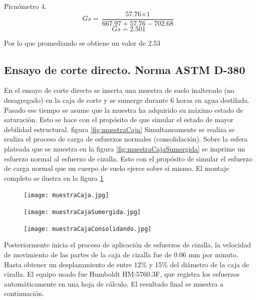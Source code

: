 Picn\'ometro 4.
$$Gs =\frac{\textit{57.76}  \times \textit{1} }{\textit{667.97}   + \textit{57.76}- \textit{702.68}}    $$
$$Gs =2.501   $$

Por lo que promediando se obtiene un valor de 2.53




\subsection{Ensayo de corte directo. Norma ASTM D-380}
En el ensayo de corte directo se inserta una muestra de suelo inalterado (no desagregado) en la caja de corte y se sumerge durante 6 horas en agua destilada. Pasado ese tiempo se asume que la muestra ha adquirido su m\'aximo estado de saturaci\'on.  Esto se hace con el prop\'osito de que simular el estado de mayor debilidad estructural. figura \ref{fig:muestraCaja}
Simultaneamente se realiza se realiza el proceso de carga de esfuerzos normales (consolidaci\'on). Sobre la esfera plateada que se muestra en la figura \ref{fig:muestraCajaSumergida} se imprime un esfuerzo normal al esfuerzo de cizalla. Esto con el prop\'osito de simular el esfuerzo de carga normal que un cuerpo de suelo ejerce sobre s\'i mismo. El montaje completo se ilustra en la figura \ref{fig:muestraCajaConsolidando}





\begin{figure}[]
\centering
\begin{minipage}{.45\linewidth}
  \texttt{[image: muestraCaja.jpg]}
  \label{fig:muestraCaja}
\end{minipage}
\hspace{.05\linewidth}
\begin{minipage}{.45\linewidth}
  \texttt{[image: muestraCajaSumergida.jpg]}
  \label{fig:muestraCajaSumergida}
\end{minipage}
\hspace{.05\linewidth}
\begin{minipage}{.45\linewidth}
  \texttt{[image: muestraCajaConsolidando.jpg]}
  \label{fig:muestraCajaConsolidando}
\end{minipage}

\end{figure}


Posteriormente inicia el proceso de aplicaci\'on de esfuerzos de cizalla, la velocidad de movimiento de las partes de la caja de cizalla fue de 0.06 mm por minuto. Hasta obtener un desplazamiento de entre 12\% y 15\% del di\'ametro de la caja de cizalla.
El equipo usado fue Humboldt HM-5760.3F, que registra los esfuerzos autom\'aticamente en una hoja de c\'alculo. El resultado final se muestra a continuaci\'on.

